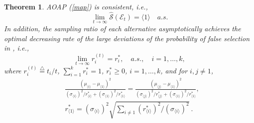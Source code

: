 \documentclass[journal]{IEEEtran}
\newcommand{\ed}{\stackrel{\triangle}{=}}
\newtheorem{theorem}{Theorem}
\begin{document}
\begin{theorem} \label{thm3} AOAP (\ref{map}) is consistent, i.e.,
$$\lim_{t\to\infty}\widehat{\mathcal{S}}(\mathcal{E}_t)=\langle 1 \rangle\quad a.s.$$
In addition, the sampling ratio of each alternative asymptotically achieves the optimal decreasing rate of the large deviations of the probability of false selection in \cite{glynn2004large}, i.e., 
$$\lim_{t\to\infty} r_i^{(t)}= r_i^{*},\quad a.s.,\quad i=1,\ldots,k,$$
where $r_i^{(t)}\ed t_i/t$, $\sum_{i=1}^{k} r_i^{*}=1$, $r_i^{*}\geq 0$, $i=1,\ldots,k$, and for $i,j\neq 1$, 
\begin{align}
&\frac{(\mu_{\langle i \rangle}-\mu_{\langle 1 \rangle})^2}{\left(\sigma_{\langle i \rangle}\right)^2/r_{\langle i \rangle}^{*}+\left(\sigma_{\langle 1 \rangle}\right)^2/r_{\langle 1 \rangle}^{*}}=\frac{(\mu_{\langle j\rangle}-\mu_{\langle 1 \rangle})^2}{\left(\sigma_{\langle j\rangle}\right)^2/r_{\langle j\rangle}^{*}+\left(\sigma_{\langle 1 \rangle}\right)^2/r_{\langle 1 \rangle}^{*}},\label{a1}\\ \label{a2}
&r_{\langle 1 \rangle}^{*}=\left(\sigma_{\langle i \rangle}\right)^2\sqrt{\sum_{i\neq 1}\left(r_{\langle i \rangle}^{*}\right)^2/\left(\sigma_{\langle i \rangle}\right)^2}~.
\end{align}
\end{theorem}
\end{document}

